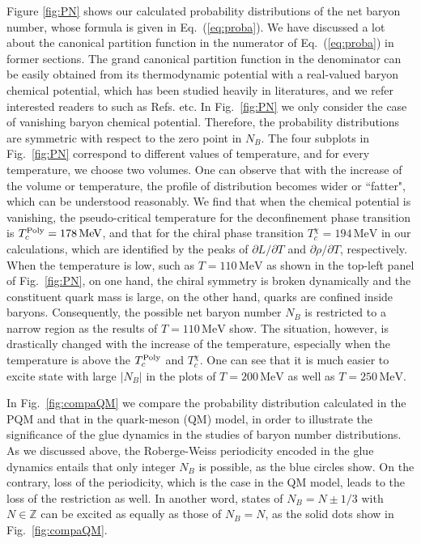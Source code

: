 \documentclass[%
reprint,
superscriptaddress,
showpacs,preprintnumbers,
 amsmath,amssymb,
 aps,
prd,
]{revtex4-1}
\def\Fig#1{Fig.~\ref{#1}} \def\Tab#1{Tab.~\ref{#1}}
\def\Eq#1{Eq.~(\ref{#1})}
\begin{document}
Figure \ref{fig:PN} shows our calculated probability distributions of the net baryon number, whose formula is given in \Eq{eq:proba}. We have discussed a lot about the canonical partition function in the numerator of \Eq{eq:proba} in former sections. The grand canonical partition function in the denominator can be easily obtained from its thermodynamic potential with a real-valued baryon chemical potential, which has been studied heavily in literatures, and we refer interested readers to such as Refs. \cite{Fu:2015naa,Fu:2015amv} etc. In \Fig{fig:PN} we only consider the case of vanishing baryon chemical potential. Therefore, the probability distributions are symmetric with respect to the zero point in $N_B$. The four subplots in \Fig{fig:PN} correspond to different values of temperature, and for every temperature, we choose two volumes. One can observe that with the increase of the volume or temperature, the profile of distribution becomes wider or ``fatter", which can be understood reasonably. We find that when the chemical potential is vanishing, the pseudo-critical temperature for the deconfinement phase transition is $T_c^{\tiny{\text{Poly}}}=178\,\text{MeV}$, and that for the chiral phase transition $T_c^{\chi}=194\,\text{MeV}$ in our calculations, which are identified by the peaks of $\partial L/\partial T$ and $\partial \rho/\partial T$, respectively.  When the temperature is low, such as $T=110\,\text{MeV}$ as shown in the top-left panel of \Fig{fig:PN}, on one hand, the chiral symmetry is broken dynamically and the constituent quark mass is large, on the other hand, quarks are confined inside baryons. Consequently, the possible net baryon number $N_B$ is restricted to a narrow region as the results of $T=110\,\text{MeV}$ show. The situation, however, is drastically changed with the increase of the temperature, especially when the temperature is above the $T_c^{\tiny{\text{Poly}}}$ and $T_c^{\chi}$. One can see that it is much easier to excite state with large $|N_B|$ in the plots of $T=200\,\text{MeV}$ as well as $T=250\,\text{MeV}$.

In \Fig{fig:compaQM} we compare the probability distribution calculated in the PQM and that in the quark-meson (QM) model, in order to illustrate 
the significance of the glue dynamics in the studies of baryon number distributions. As we discussed above, the Roberge-Weiss periodicity encoded in the glue dynamics entails that only integer $N_B$ is possible, as the blue circles show. On the contrary, loss of the periodicity, which is the case in the QM model, leads to the loss of the restriction as well. In another word, states of $N_B=N\pm 1/3$ with $N\in\mathbb{Z}$ can be excited as equally as those of $N_B=N$, as the solid dots show in \Fig{fig:compaQM}.
\end{document}
